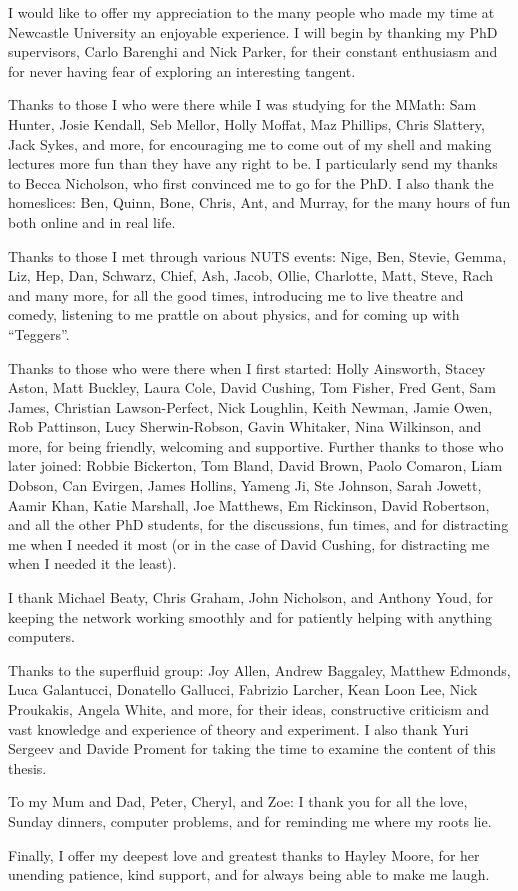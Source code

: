 \begin{acknowledgements}
 I would like to offer my appreciation to the many people who made my time at Newcastle University an enjoyable experience. I will begin by thanking my PhD supervisors, Carlo Barenghi and Nick Parker, for their constant enthusiasm and for never having fear of exploring an interesting tangent.

 Thanks to those I who were there while I was studying for the MMath: Sam Hunter, Josie Kendall, Seb Mellor, Holly Moffat, Maz Phillips, Chris Slattery, Jack Sykes, and more, for encouraging me to come out of my shell and making lectures more fun than they have any right to be. I particularly send my thanks to Becca Nicholson, who first convinced me to go for the PhD. I also thank the homeslices: Ben, Quinn, Bone, Chris, Ant, and Murray, for the many hours of fun both online and in real life.

 Thanks to those I met through various NUTS events: Nige, Ben, Stevie, Gemma, Liz, Hep, Dan, Schwarz, Chief, Ash, Jacob, Ollie, Charlotte, Matt, Steve, Rach and many more, for all the good times, introducing me to live theatre and comedy, listening to me prattle on about physics, and for coming up with ``Teggers''. 

 Thanks to those who were there when I first started: Holly Ainsworth, Stacey Aston, Matt Buckley, Laura Cole, David Cushing, Tom Fisher, Fred Gent, Sam James, Christian Lawson-Perfect, Nick Loughlin, Keith Newman, Jamie Owen, Rob Pattinson, Lucy Sherwin-Robson, Gavin Whitaker, Nina Wilkinson, and more, for being friendly, welcoming and supportive. Further thanks to those who later joined: Robbie Bickerton, Tom Bland, David Brown, Paolo Comaron, Liam Dobson, Can Evirgen, James Hollins, Yameng Ji, Ste Johnson, Sarah Jowett, Aamir Khan, Katie Marshall, Joe Matthews, Em Rickinson, David Robertson, and all the other PhD students, for the discussions, fun times, and for distracting me when I needed it most (or in the case of David Cushing, for distracting me when I needed it the least).

 I thank Michael Beaty, Chris Graham, John Nicholson, and Anthony Youd, for keeping the network working smoothly and for patiently helping with anything computers.

 Thanks to the superfluid group: Joy Allen, Andrew Baggaley, Matthew Edmonds, Luca Galantucci, Donatello Gallucci, Fabrizio Larcher, Kean Loon Lee, Nick Proukakis, Angela White, and more, for their ideas, constructive criticism and vast knowledge and experience of theory and experiment. I also thank Yuri Sergeev and Davide Proment for taking the time to examine the content of this thesis.

 To my Mum and Dad, Peter, Cheryl, and Zoe: I thank you for all the love, Sunday dinners, computer problems, and for reminding me where my roots lie.

 Finally, I offer my deepest love and greatest thanks to Hayley Moore, for her unending patience, kind support, and for always being able to make me laugh.


\end{acknowledgements}
\thispagestyle{empty}
\restoregeometry
